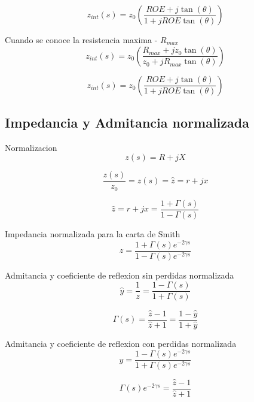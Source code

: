 \documentclass[12pt,letterpaper]{article}
\begin{document}
\begin{equation}
    z_{int}(s)=z_{0}(\frac{ROE+j\tan(\theta)}{1+jROE\tan(\theta)})
\end{equation}

Cuando se conoce la resistencia maxima - $R_{max}$
\begin{equation}
    z_{int}(s)=z_{0}(\frac{R_{max}+jz_{0}\tan(\theta)}{z_{0}+jR_{max}\tan(\theta)})
\end{equation}

\begin{equation}
    z_{int}(s)=z_{0}(\frac{ROE+j\tan(\theta)}{1+jROE\tan(\theta)})
\end{equation}

\subsection{Impedancia y Admitancia normalizada}
Normalizacion
\begin{equation}
    z(s)=R+jX
\end{equation}

\begin{equation}
    \frac{z(s)}{z_0}=z(s)=\hat{z}=r+jx
\end{equation}

\begin{equation}
    \hat{z}=r+jx=\frac{1+\Gamma(s)}{1-\Gamma(s)}
\end{equation}

Impedancia normalizada para la carta de Smith
\begin{equation}
    \hat{z}=\frac{1+\Gamma(s)e^{-2 \gamma s}}{1-\Gamma(s)e^{-2 \gamma s}}
\end{equation}

Admitancia y coeficiente de reflexion sin perdidas normalizada
\begin{equation}
    \hat{y}=\frac{1}{z}=\frac{1-\Gamma(s)}{1+\Gamma(s)}
\end{equation}

\begin{equation}
    \Gamma(s)=\frac{\hat{z}-1}{\hat{z}+1}=\frac{1-\hat{y}}{1+\hat{y}}
\end{equation}

Admitancia y coeficiente de reflexion con perdidas normalizada
\begin{equation}
    \hat{y}=\frac{1-\Gamma(s)e^{-2 \gamma s}}{1+\Gamma(s)e^{-2 \gamma s}}
\end{equation}

\begin{equation}
    \Gamma(s)e^{-2 \gamma s}=\frac{\hat{z}-1}{\hat{z}+1}
\end{equation}
\end{document}
